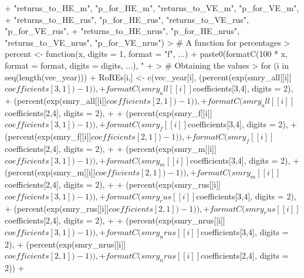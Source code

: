 \documentclass[12pt,a4paper]{article}
\begin{document}
\begin{Schunk}
\begin{Sinput}
+                       "returns_to_HE_m", "p_for_HE_m", "returns_to_VE_m", "p_for_VE_m",
+                       "returns_to_HE_rus", "p_for_HE_rus", "returns_to_VE_rus", "p_for_VE_rus",
+                       "returns_to_HE_nrus", "p_for_HE_nrus", "returns_to_VE_nrus", "p_for_VE_nrus")
> # A function for percentages
> percent <- function(x, digits = 1, format = "f", ...) {
+   paste0(formatC(100 * x, format = format, digits = digits, ...), "%
+ }
> # Obtaining the values
> for (i in seq(length(vec_year))){
+   RoREs[i,] <- c(vec_year[i], (percent(exp(smry_all[[i]]$coefficients[3,1]) - 1)),
+                  formatC(smry_all[[i]]$coefficients[3,4], digits = 2),
+                  (percent(exp(smry_all[[i]]$coefficients[2,1]) - 1)),
+                  formatC(smry_all[[i]]$coefficients[2,4], digits = 2),
+                  
+                  (percent(exp(smry_f[[i]]$coefficients[3,1]) - 1)),
+                  formatC(smry_f[[i]]$coefficients[3,4], digits = 2),
+                  (percent(exp(smry_f[[i]]$coefficients[2,1]) - 1)),
+                  formatC(smry_f[[i]]$coefficients[2,4], digits = 2),
+                  
+                  (percent(exp(smry_m[[i]]$coefficients[3,1]) - 1)),
+                  formatC(smry_m[[i]]$coefficients[3,4], digits = 2),
+                  (percent(exp(smry_m[[i]]$coefficients[2,1]) - 1)),
+                  formatC(smry_m[[i]]$coefficients[2,4], digits = 2),
+                  
+                  (percent(exp(smry_rus[[i]]$coefficients[3,1]) - 1)),
+                  formatC(smry_rus[[i]]$coefficients[3,4], digits = 2),
+                  (percent(exp(smry_rus[[i]]$coefficients[2,1]) - 1)),
+                  formatC(smry_rus[[i]]$coefficients[2,4], digits = 2),
+                  
+                  (percent(exp(smry_nrus[[i]]$coefficients[3,1]) - 1)),
+                  formatC(smry_nrus[[i]]$coefficients[3,4], digits = 2),
+                  (percent(exp(smry_nrus[[i]]$coefficients[2,1]) - 1)),
+                  formatC(smry_nrus[[i]]$coefficients[2,4], digits = 2))
+ }
\end{Sinput}
\end{Schunk}
\end{document}
